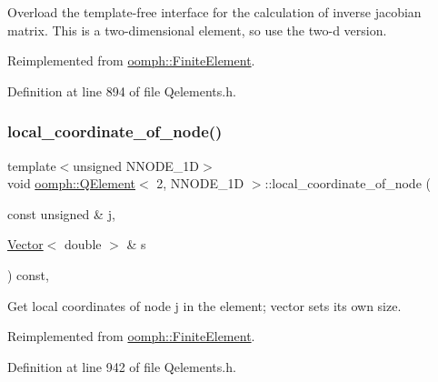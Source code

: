 Overload the template-\/free interface for the calculation of inverse jacobian matrix. This is a two-\/dimensional element, so use the two-\/d version. 



Reimplemented from \hyperlink{classoomph_1_1FiniteElement_a42c86a7628fee00d3a9d35b935b29e48}{oomph\+::\+Finite\+Element}.



Definition at line 894 of file Qelements.\+h.

\mbox{\label{classoomph_1_1QElement_3_012_00_01NNODE__1D_01_4_ab5718b72ff86f466b6af73cf9cc69559}} 
\subsubsection{\texorpdfstring{local\+\_\+coordinate\+\_\+of\+\_\+node()}{local\_coordinate\_of\_node()}}
{\footnotesize\ttfamily template$<$unsigned N\+N\+O\+D\+E\+\_\+1D$>$ \\
void \hyperlink{classoomph_1_1QElement}{oomph\+::\+Q\+Element}$<$ 2, N\+N\+O\+D\+E\+\_\+1D $>$\+::local\+\_\+coordinate\+\_\+of\+\_\+node (\begin{DoxyParamCaption}\item[{const unsigned \&}]{j,  }\item[{\hyperlink{classoomph_1_1Vector}{Vector}$<$ double $>$ \&}]{s }\end{DoxyParamCaption}) const\hspace{0.3cm}{\ttfamily [inline]}, {\ttfamily [virtual]}}



Get local coordinates of node j in the element; vector sets its own size. 



Reimplemented from \hyperlink{classoomph_1_1FiniteElement_a22bc4ee35e4f948d8d7fba18c7b4f4c4}{oomph\+::\+Finite\+Element}.



Definition at line 942 of file Qelements.\+h.



